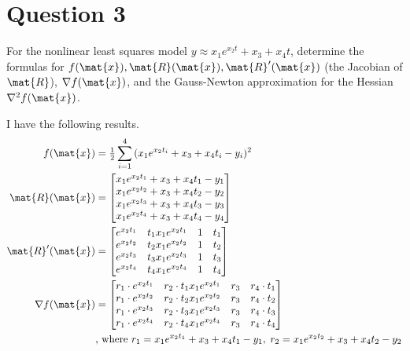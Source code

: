 \section{Question 3}

\begin{question}
    For the nonlinear least squares model $y \approx x_1e^{x_2t}+x_3+x_4t$, determine the formulas for $f(\mat{x}), \mat{R}(\mat{x}), \mat{R}'(\mat{x})$ (the Jacobian of $\mat{R}$), $\nabla f(\mat{x})$, and the Gauss-Newton approximation for
the Hessian $\nabla^2 f(\mat{x})$.
\end{question}

\begin{answer}
    I have the following results.
    \begin{align}
    f(\mat{x}) &= \tfrac{1}{2}\sum_{i = 1}^{4}{(x_1e^{x_2t_i}+x_3+x_4t_i-y_i)^2}\\
    \mat{R}(\mat{x}) &= \left[\begin{matrix}
        x_1e^{x_2t_1}+x_3+x_4t_1-y_1\\
        x_1e^{x_2t_2}+x_3+x_4t_2-y_2\\
        x_1e^{x_2t_3}+x_3+x_4t_3-y_3\\
        x_1e^{x_2t_4}+x_3+x_4t_4-y_4
    \end{matrix}\right]\\
    \mat{R}'(\mat{x}) &=  \left[\begin{matrix}
        e^{x_2t_1} & t_1x_1e^{x_2t_1} & 1 & t_1\\
        e^{x_2t_2} & t_2x_1e^{x_2t_2} & 1 & t_2\\
        e^{x_2t_3} & t_3x_1e^{x_2t_3} & 1 & t_3\\
        e^{x_2t_4} & t_4x_1e^{x_2t_4} & 1 & t_4
    \end{matrix}\right]\\
    \nabla f(\mat{x}) &= \left[\begin{matrix}
        r_1\cdot e^{x_2t_1} & r_2\cdot t_1x_1e^{x_2t_1} & r_3 & r_4\cdot t_1\\
        r_1\cdot e^{x_2t_2} & r_2\cdot t_2x_1e^{x_2t_2} & r_3 & r_4\cdot t_2\\
        r_1\cdot e^{x_2t_3} & r_2\cdot t_3x_1e^{x_2t_3} & r_3 & r_4\cdot t_3\\
        r_1\cdot e^{x_2t_4} & r_2\cdot t_4x_1e^{x_2t_4} & r_3 & r_4\cdot t_4
    \end{matrix}\right]\\
    & \text{, where } r_1 = x_1e^{x_2t_1}+x_3+x_4t_1-y_1,\; r_2 = x_1e^{x_2t_2}+x_3+x_4t_2-y_2\\

\end{align}
\end{answer}
